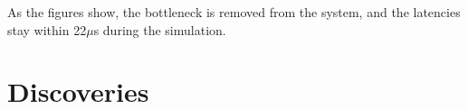 As the figures show, the bottleneck is removed from the system, and the latencies stay within 22$\mu$s during the simulation.

\section{Discoveries}


